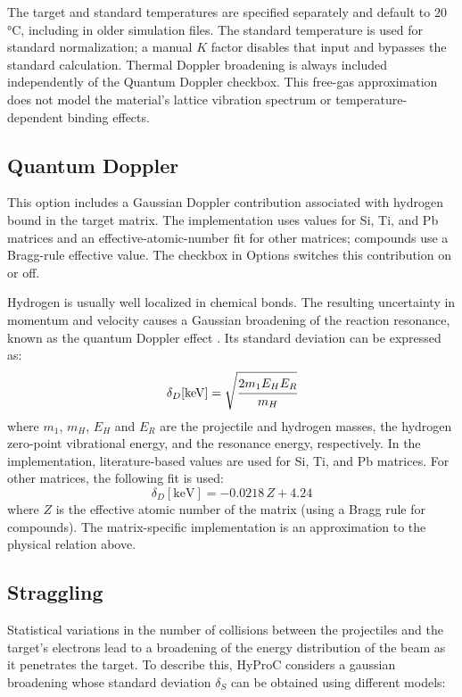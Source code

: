 \documentclass[11pt,a4paper]{article}
\begin{document}
The target and standard temperatures are specified separately and default to 20 °C, including in older simulation files. The standard temperature is used for standard normalization; a manual $K$ factor disables that input and bypasses the standard calculation. Thermal Doppler broadening is always included independently of the Quantum Doppler checkbox. This free-gas approximation does not model the material's lattice vibration spectrum or temperature-dependent binding effects.

\subsection{Quantum Doppler}
This option includes a Gaussian Doppler contribution associated with hydrogen bound in the target matrix. The implementation uses values for Si, Ti, and Pb matrices and an effective-atomic-number fit for other matrices; compounds use a Bragg-rule effective value. The checkbox in Options switches this contribution on or off.

Hydrogen is usually well localized in chemical bonds. The resulting uncertainty in momentum and velocity causes a Gaussian broadening of the reaction resonance, known as the quantum Doppler effect \cite{horn1988observation}. Its standard deviation can be expressed as:
\begin{equation}
    \delta_D[\text{keV}] = \sqrt{\cfrac{2 m_1 E_H E_R}{m_H}}
    \label{eq:dopplerSD}
\end{equation}
where $m_1$, $m_H$, $E_H$ and $E_R$ are the projectile and hydrogen masses, the hydrogen zero-point vibrational energy, and the resonance energy, respectively. In the implementation, literature-based values are used for Si, Ti, and Pb matrices. For other matrices, the following fit is used:
\begin{equation}
    \delta_D[\text{keV}] = -0.0218\,Z + 4.24
    \label{eq:dopplerSDfit}
\end{equation}
where $Z$ is the effective atomic number of the matrix (using a Bragg rule for compounds). The matrix-specific implementation is an approximation to the physical relation above.

\subsection{Straggling}
Statistical variations in the number of collisions between the projectiles and the target's electrons lead to a broadening of the energy distribution of the beam as it penetrates the target. To describe this, HyProC considers a gaussian broadening whose standard deviation $\delta_S$ can be obtained using different models:
\end{document}
